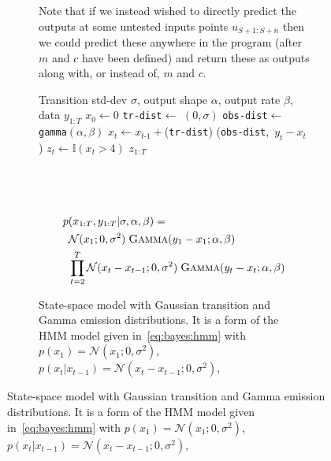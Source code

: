 \begin{figure}[p]
\begin{subfigure}[t]{\textwidth}
{%
		  Note that if we instead
		  wished to directly predict the outputs at some untested inputs points $u_{S+1:S+n}$ then we could
		  predict these anywhere in the program (after $m$ and $c$ have been defined) and return these
		  as outputs along with, or instead of, $m$ and $c$.
		  \label{fig:probprog:linear-reg}
		  }
	\end{subfigure}
		\begin{subfigure}[t]{\textwidth}
			\vspace{10pt}
\centering	
\begin{minipage}[t]{0.45\textwidth}
	\begin{algorithmic}[1]
		\renewcommand{\algorithmicrequire}{\textbf{Inputs:}}
		\renewcommand{\algorithmicensure}{\textbf{Outputs:}}			 
		\Require Transition std-dev $\sigma$, output shape $\alpha$,
		output rate $\beta$, data $y_{1:T}$
		\State $x_0\leftarrow0$
		\State \lstinline$tr-dist$\xspace $\leftarrow$ \normal $(0,\sigma)$
		\State \lstinline$obs-dist$\xspace $\leftarrow$ \lstinline$gamma$\xspace $(\alpha,\beta)$
		\State $x_t \leftarrow x_{t\text{-}1}+$\sample(\lstinline$tr-dist$\xspace)
		\State \observe(\lstinline$obs-dist$\xspace,~$y_t-x_t$)
		\State $z_t \leftarrow \mathbb{I}(x_t>4)$
		\EndFor
		\State \Return $z_{1:T}$
	\end{algorithmic}
\end{minipage}
~~
\begin{minipage}[t]{0.52\textwidth}
	\vspace{-6pt}
	~~~\resizebox{0.96\textwidth}{!}{
		}
	{\small
	\begin{align*}
	p&(x_{1:T}, y_{1:T} | \sigma,\alpha,\beta)= \\
	&\mathcal{N}(x_1;0,\sigma^2) \; \textsc{Gamma}(y_1-x_1;\alpha,\beta)\\
	&\prod_{t=2}^{T} \mathcal{N}(x_t-x_{t-1};0,\sigma^2) \; \textsc{Gamma} (y_t-x_t;\alpha,\beta)
	\end{align*}}
\end{minipage}
			\caption{State-space model with Gaussian transition and Gamma emission distributions.
				It is a form of the HMM model given in~\eqref{eq:bayes:hmm} with
				$p(x_1)=\mathcal{N}(x_1;0,\sigma^2)$, $p(x_t | x_{t-1}) = \mathcal{N}(x_t-x_{t-1}; 0,\sigma^2)$,
}
\end{subfigure}
\end{figure}
